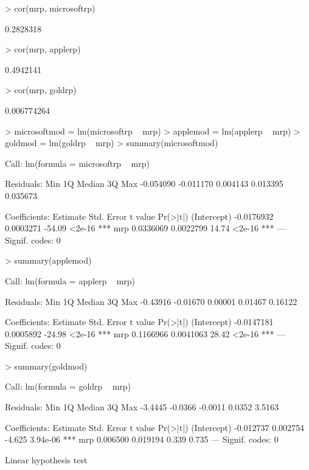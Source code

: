 \documentclass[12pt, a14paper, lithuanian]{article}
\begin{document}
\begin{Schunk}
\begin{Sinput}
> cor(mrp, microsoftrp)
\end{Sinput}
\begin{Soutput}
[1] 0.2828318
\end{Soutput}
\begin{Sinput}
> cor(mrp, applerp)
\end{Sinput}
\begin{Soutput}
[1] 0.4942141
\end{Soutput}
\begin{Sinput}
> cor(mrp, goldrp)
\end{Sinput}
\begin{Soutput}
[1] 0.006774264
\end{Soutput}
\begin{Sinput}
> microsoftmod = lm(microsoftrp ~ mrp)
> applemod = lm(applerp ~ mrp)
> goldmod = lm(goldrp ~ mrp)
> summary(microsoftmod)
\end{Sinput}
\begin{Soutput}
Call:
lm(formula = microsoftrp ~ mrp)

Residuals:
      Min        1Q    Median        3Q       Max 
-0.054090 -0.011170  0.004143  0.013395  0.035673 

Coefficients:
              Estimate Std. Error t value Pr(>|t|)    
(Intercept) -0.0176932  0.0003271  -54.09   <2e-16 ***
mrp          0.0336069  0.0022799   14.74   <2e-16 ***
---
Signif. codes:  0 
\end{Soutput}
\begin{Sinput}
> summary(applemod)
\end{Sinput}
\begin{Soutput}
Call:
lm(formula = applerp ~ mrp)

Residuals:
     Min       1Q   Median       3Q      Max 
-0.43916 -0.01670  0.00001  0.01467  0.16122 

Coefficients:
              Estimate Std. Error t value Pr(>|t|)    
(Intercept) -0.0147181  0.0005892  -24.98   <2e-16 ***
mrp          0.1166966  0.0041063   28.42   <2e-16 ***
---
Signif. codes:  0 
\end{Soutput}
\begin{Sinput}
> summary(goldmod)
\end{Sinput}
\begin{Soutput}
Call:
lm(formula = goldrp ~ mrp)

Residuals:
    Min      1Q  Median      3Q     Max 
-3.4445 -0.0366 -0.0011  0.0352  3.5163 

Coefficients:
             Estimate Std. Error t value Pr(>|t|)    
(Intercept) -0.012737   0.002754  -4.625 3.94e-06 ***
mrp          0.006500   0.019194   0.339    0.735    
---
Signif. codes:  0 
\end{Soutput}
\begin{Soutput}
Linear hypothesis test


\end{Soutput}
\end{Schunk}
\end{document}
